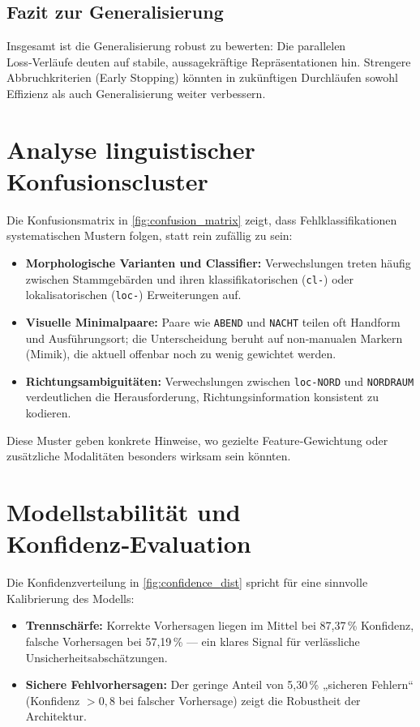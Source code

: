 \subsection{Fazit zur Generalisierung}
Insgesamt ist die Generalisierung robust zu bewerten: Die parallelen Loss‑Verläufe deuten auf stabile, aussagekräftige Repräsentationen hin. Strengere Abbruchkriterien (Early Stopping) könnten in zukünftigen Durchläufen sowohl Effizienz als auch Generalisierung weiter verbessern.

\section{Analyse linguistischer Konfusionscluster}
Die Konfusionsmatrix in \autoref{fig:confusion_matrix} zeigt, dass Fehlklassifikationen systematischen Mustern folgen, statt rein zufällig zu sein:
\begin{itemize}
    \item \textbf{Morphologische Varianten und Classifier:} Verwechslungen treten häufig zwischen Stammgebärden und ihren klassifikatorischen (\texttt{cl-}) oder lokalisatorischen (\texttt{loc-}) Erweiterungen auf.
    \item \textbf{Visuelle Minimalpaare:} Paare wie \texttt{ABEND} und \texttt{NACHT} teilen oft Handform und Ausführungsort; die Unterscheidung beruht auf non‑manualen Markern (Mimik), die aktuell offenbar noch zu wenig gewichtet werden.
    \item \textbf{Richtungsambiguitäten:} Verwechslungen zwischen \texttt{loc-NORD} und \texttt{NORDRAUM} verdeutlichen die Herausforderung, Richtungsinformation konsistent zu kodieren.
\end{itemize}
Diese Muster geben konkrete Hinweise, wo gezielte Feature‑Gewichtung oder zusätzliche Modalitäten besonders wirksam sein könnten.

\section{Modellstabilität und Konfidenz‑Evaluation}
Die Konfidenzverteilung in \autoref{fig:confidence_dist} spricht für eine sinnvolle Kalibrierung des Modells:
\begin{itemize}
    \item \textbf{Trennschärfe:} Korrekte Vorhersagen liegen im Mittel bei 87,37\,\% Konfidenz, falsche Vorhersagen bei 57,19\,\% — ein klares Signal für verlässliche Unsicherheitsabschätzungen.
    \item \textbf{Sichere Fehlvorhersagen:} Der geringe Anteil von 5,30\,\% „sicheren Fehlern“ (Konfidenz $>0{,}8$ bei falscher Vorhersage) zeigt die Robustheit der Architektur.
\end{itemize}

